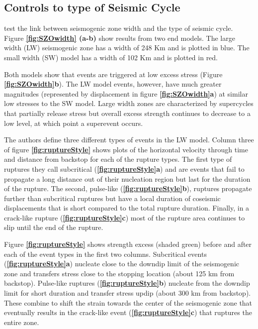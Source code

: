 \documentclass[]{proposalnsf}
\begin{document}
\subsection{Controls to type of Seismic Cycle}
\citet{Herrendorfer2015} test the link between seismogenic zone width and the type of seismic cycle. Figure {\bf \ref{fig:SZOwidth} (a-b)} show results from two end models. The large width (LW) seismogenic zone has a width of 248 Km and is plotted in blue. The small width (SW) model has a width of 102 Km and is plotted in red. 

Both models show that events are triggered at low excess stress (Figure {\bf \ref{fig:SZOwidth}b}). The LW model events, however, have much greater magnitudes (represented by displacement in figure {\bf \ref{fig:SZOwidth}a}) at similar low stresses to the SW model. Large width zones are characterized by supercycles that partially release stress but overall excess strength continues to decrease to a low level, at which point a superevent occurs. 

The authors define three different types of events in the LW model. Column three of figure {\bf \ref{fig:ruptureStyle}} shows plots of the horizontal velocity through time and distance from backstop for each of the rupture types. The first type of ruptures they call subcritical ({\bf \ref{fig:ruptureStyle}a}) and are events that fail to propagate a long distance out of their nucleation region but last for the duration of the rupture. The second, pulse-like ({\bf \ref{fig:ruptureStyle}b}), ruptures propagate further than subcritical ruptures but have a local duration of coseismic displacements that is short compared to the total rupture duration. Finally, in a crack-like rupture ({\bf \ref{fig:ruptureStyle}c}) most of the rupture area continues to slip until the end of the rupture. 

Figure {\bf \ref{fig:ruptureStyle}} shows strength excess (shaded green) before and after each of the event types in the first two columns. Subcritical events ({\bf \ref{fig:ruptureStyle}a}) nucleate close to the downdip limit of the seismogenic zone and transfers stress close to the stopping location (about 125 km from backstop). Pulse-like ruptures ({\bf \ref{fig:ruptureStyle}b}) nucleate from the downdip limit for short duration and transfer stress updip (about 300 km from backstop). These combine to shift the strain towards the center of the seismogenic zone that eventually results in the crack-like event ({\bf \ref{fig:ruptureStyle}c}) that ruptures the entire zone. 
\end{document}
